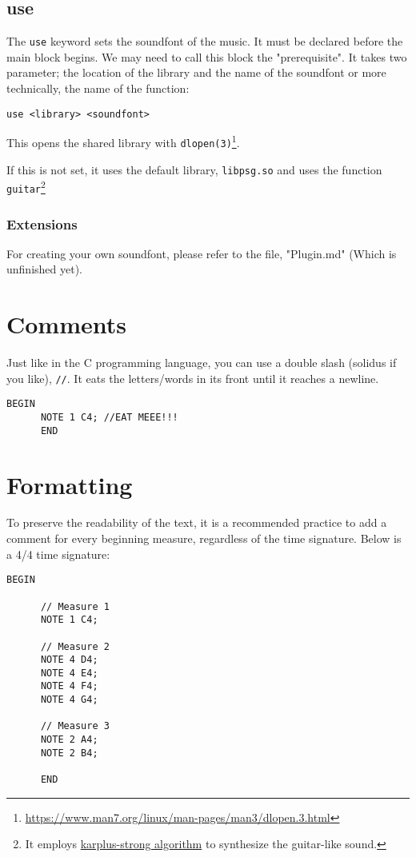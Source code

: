 \documentclass{article}
\begin{document}
\subsection{use}

The \verb+use+ keyword sets the soundfont of the music. It must be declared before the main block begins.
We may need to call this block the "prerequisite".
It takes two parameter; the location of the library and the name of the soundfont
or more technically, the name of the function:
\begin{Verbatim}[frame=single]
      use <library> <soundfont>
\end{Verbatim}

This opens the shared library with \verb+dlopen(3)+\footnote{\url{https://www.man7.org/linux/man-pages/man3/dlopen.3.html}}.

If this is not set, it uses the default library, \verb+libpsg.so+ and uses the function \verb+guitar+\footnote{It employs \href{wikipedia.org/wiki/Karplus\%E2\%80\%93Strong_string_synthesis}{karplus-strong algorithm} to synthesize the guitar-like sound.}

\subsubsection{Extensions}
For creating your own soundfont, please refer to the file, "Plugin.md" (Which is unfinished yet).

\section{Comments}
Just like in the C programming language, you can use a double slash (solidus if you like), \verb+//+.
It eats the letters/words in its front until it reaches a newline.
\begin{Verbatim}[frame=single]
      BEGIN
      NOTE 1 C4; //EAT MEEE!!!
      END
\end{Verbatim}

\section{Formatting}
To preserve the readability of the text, it is a recommended practice to add a comment for every
beginning measure, regardless of the time signature. Below is a 4/4 time signature:
\begin{Verbatim}[frame=single]
      BEGIN

      // Measure 1
      NOTE 1 C4;

      // Measure 2
      NOTE 4 D4;
      NOTE 4 E4;
      NOTE 4 F4;
      NOTE 4 G4;

      // Measure 3
      NOTE 2 A4;
      NOTE 2 B4;

      END
\end{Verbatim}
\end{document}
